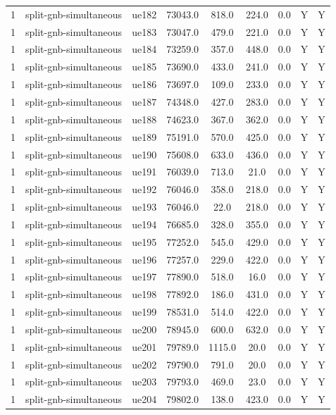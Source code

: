 \begin{table}[ht]
\begin{tabular}{|c|c|c|c|c|c|c|c|c|}
1 & split-gnb-simultaneous & ue182 & 73043.0 & 818.0 & 224.0 & 0.0 & Y & Y \\
1 & split-gnb-simultaneous & ue183 & 73047.0 & 479.0 & 221.0 & 0.0 & Y & Y \\
1 & split-gnb-simultaneous & ue184 & 73259.0 & 357.0 & 448.0 & 0.0 & Y & Y \\
1 & split-gnb-simultaneous & ue185 & 73690.0 & 433.0 & 241.0 & 0.0 & Y & Y \\
1 & split-gnb-simultaneous & ue186 & 73697.0 & 109.0 & 233.0 & 0.0 & Y & Y \\
1 & split-gnb-simultaneous & ue187 & 74348.0 & 427.0 & 283.0 & 0.0 & Y & Y \\
1 & split-gnb-simultaneous & ue188 & 74623.0 & 367.0 & 362.0 & 0.0 & Y & Y \\
1 & split-gnb-simultaneous & ue189 & 75191.0 & 570.0 & 425.0 & 0.0 & Y & Y \\
1 & split-gnb-simultaneous & ue190 & 75608.0 & 633.0 & 436.0 & 0.0 & Y & Y \\
1 & split-gnb-simultaneous & ue191 & 76039.0 & 713.0 & 21.0 & 0.0 & Y & Y \\
1 & split-gnb-simultaneous & ue192 & 76046.0 & 358.0 & 218.0 & 0.0 & Y & Y \\
1 & split-gnb-simultaneous & ue193 & 76046.0 & 22.0 & 218.0 & 0.0 & Y & Y \\
1 & split-gnb-simultaneous & ue194 & 76685.0 & 328.0 & 355.0 & 0.0 & Y & Y \\
1 & split-gnb-simultaneous & ue195 & 77252.0 & 545.0 & 429.0 & 0.0 & Y & Y \\
1 & split-gnb-simultaneous & ue196 & 77257.0 & 229.0 & 422.0 & 0.0 & Y & Y \\
1 & split-gnb-simultaneous & ue197 & 77890.0 & 518.0 & 16.0 & 0.0 & Y & Y \\
1 & split-gnb-simultaneous & ue198 & 77892.0 & 186.0 & 431.0 & 0.0 & Y & Y \\
1 & split-gnb-simultaneous & ue199 & 78531.0 & 514.0 & 422.0 & 0.0 & Y & Y \\
1 & split-gnb-simultaneous & ue200 & 78945.0 & 600.0 & 632.0 & 0.0 & Y & Y \\
1 & split-gnb-simultaneous & ue201 & 79789.0 & 1115.0 & 20.0 & 0.0 & Y & Y \\
1 & split-gnb-simultaneous & ue202 & 79790.0 & 791.0 & 20.0 & 0.0 & Y & Y \\
1 & split-gnb-simultaneous & ue203 & 79793.0 & 469.0 & 23.0 & 0.0 & Y & Y \\
1 & split-gnb-simultaneous & ue204 & 79802.0 & 138.0 & 423.0 & 0.0 & Y & Y \\

\end{tabular}
\end{table}
